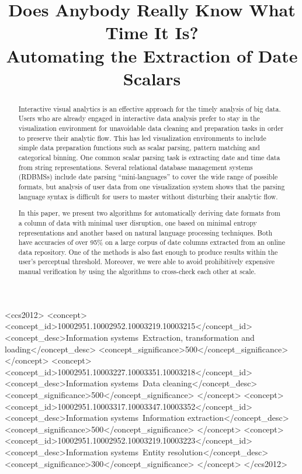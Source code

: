 \documentclass{sig-alternate-05-2015}
\begin{document}
\title{Does Anybody Really Know What Time It Is?\\
Automating the Extraction of Date Scalars}


\maketitle
\begin{abstract}
Interactive visual analytics is an effective approach for the timely analysis of big data. Users who are already engaged in interactive data analysis prefer to stay in the visualization environment for unavoidable data cleaning and preparation tasks in order to preserve their analytic flow. This has led visualization environments to include simple data preparation functions such as scalar parsing, pattern matching and categorical binning. One common scalar parsing task is extracting date and time data from string representations. Several relational database management systems (RDBMSs) include date parsing ``mini-languages'' to cover the wide range of possible formats, but analysis of user data from one visualization system shows that the parsing language syntax is difficult for users to master without disturbing their analytic flow.

In this paper, we present two algorithms for automatically deriving date formats from a column of data with minimal user disruption, one based on minimal entropy representations and another based on natural language processing techniques. Both have accuracies of over 95\% on a large corpus of date columns extracted from an online data repository. One of the methods is also fast enough to produce results within the user's perceptual threshold. Moreover, we were able to avoid prohibitively expensive manual verification by using the algorithms to cross-check each other at scale.
\end{abstract}

%
%
\begin{CCSXML}
<ccs2012>
<concept>
<concept_id>10002951.10002952.10003219.10003215</concept_id>
<concept_desc>Information systems~Extraction, transformation and loading</concept_desc>
<concept_significance>500</concept_significance>
</concept>
<concept>
<concept_id>10002951.10003227.10003351.10003218</concept_id>
<concept_desc>Information systems~Data cleaning</concept_desc>
<concept_significance>500</concept_significance>
</concept>
<concept>
<concept_id>10002951.10003317.10003347.10003352</concept_id>
<concept_desc>Information systems~Information extraction</concept_desc>
<concept_significance>500</concept_significance>
</concept>
<concept>
<concept_id>10002951.10002952.10003219.10003223</concept_id>
<concept_desc>Information systems~Entity resolution</concept_desc>
<concept_significance>300</concept_significance>
</concept>
</ccs2012>
\end{CCSXML}
\end{document}
